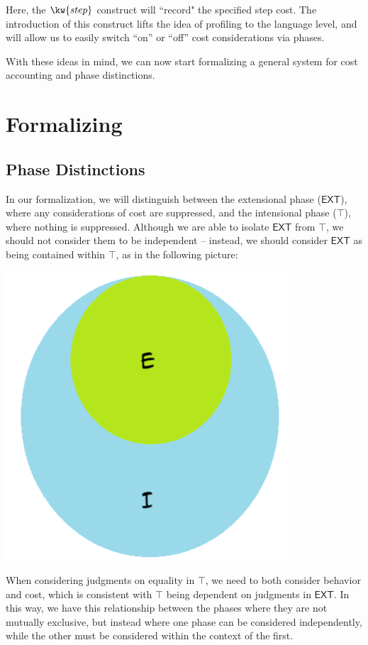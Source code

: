 \documentclass[letterpaper]{article}
\newcommand{\EXT}{\textsf{EXT}}
\begin{document}
Here, the $\kw{step}$ construct will ``record" the specified step cost. The introduction of this construct lifts the idea of profiling to the language level,
and will allow us to easily switch ``on'' or ``off'' cost considerations via phases.

With these ideas in mind, we can now start formalizing a general system for cost accounting and phase distinctions.

\section{Formalizing}

\subsection{Phase Distinctions}\label{phases}

In our formalization, we will distinguish between the extensional phase ($\EXT$), where any considerations of cost are suppressed, and the intensional phase ($\top$), where nothing is suppressed. 
Although we are able to isolate $\EXT$ from $\top$, we should not consider them to be independent -- instead, we should consider $\EXT$ as being contained within $\top$, as in the following picture:

\begin{center}
    \includegraphics[scale=0.5]{phases.png}
\end{center}

When considering judgments on equality in $\top$, we need to both consider behavior and cost, which is consistent with $\top$ being dependent on judgments in $\EXT$. 
In this way, we have this relationship between the phases where they are not mutually exclusive, but instead where one phase can be considered independently, while the other must be considered within the context of the first.
\end{document}

